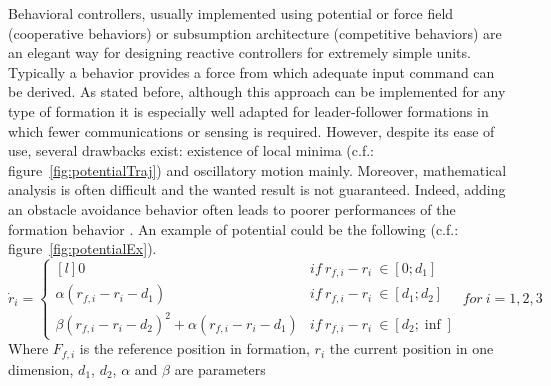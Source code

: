 \documentclass[a4paper, 12pt]{report}
\begin{document}
Behavioral controllers, usually implemented using potential or force field (cooperative behaviors) \cite{Arkin1999, Pugh2009} or subsumption architecture (competitive behaviors) are an elegant way for designing reactive controllers for extremely simple units. Typically a behavior provides a force from which adequate input command can be derived. As stated before, although this approach can be implemented for any type of formation it is especially well adapted for leader-follower formations in which fewer communications or sensing is required. However, despite its ease of use, several drawbacks exist: existence of local minima (c.f.: figure~\ref{fig:potentialTraj}) and oscillatory motion mainly. Moreover, mathematical analysis is often difficult and the wanted result is not guaranteed. Indeed, adding an obstacle avoidance behavior often leads to poorer performances of the formation behavior \cite{Ren2004}. An example of potential could be the following (c.f.: figure~\ref{fig:potentialEx}).
\[ \dot r_i =  \left\{ \begin{matrix*}[l] 0 & if\ r_{f,i}-r_i\ \in [0; d_1] \\ \alpha(r_{f,i}-r_i-d_1) & if\ r_{f,i}-r_i\ \in [d_1; d_2] \\  \beta(r_{f,i}-r_i-d_2)^2 + \alpha(r_{f,i}-r_i-d_1) & if\ r_{f,i}-r_i\ \in [d_2; \inf] \end{matrix*} \right. \ for\ i = 1,2,3\]
Where $F_{f,i}$ is the reference position in formation, $r_i$ the current position in one dimension, $d_1$, $d_2$, $\alpha$ and $\beta$ are parameters
\end{document}
